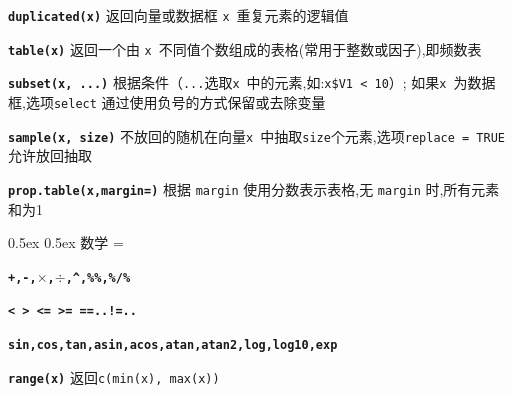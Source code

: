 \documentclass[landscape]{article}
\makeatletter
\renewcommand\section{\@startsection{section}{1}{0mm}%
                                     {0.5ex}%
                                     {0.5ex}%
                                {\color{black}\normalfont\large\bfseries}}
\newcommand{\code}{\texttt}
\newcommand{\bcode}[1]{\texttt{\textbf{#1}}}
\makeatother
\begin{document}
\begin{multicols*}{3}
\bcode{duplicated(x)}  返回向量或数据框 \code{x}~重复元素的逻辑值

\bcode{table(x)}  返回一个由 \code{x}~不同值个数组成的表格(常用于整数或因子),即频数表

\bcode{subset(x, ...)}  根据条件（\code{...}选取\code{x}~中的元素,如:\code{x\$V1 < 10}）;
如果\code{x}~为数据框,选项\code{select} 通过使用负号的方式保留或去除变量

\bcode{sample(x, size)}  不放回的随机在向量\code{x}~中抽取\code{size}个元素,选项\code{replace = TRUE}允许放回抽取

\bcode{prop.table(x,margin=)} 根据 \code{margin} 使用分数表示表格,无 \code{margin} 时,所有元素和为1



\section{数学}
\everypar={\hangindent=9mm}

\bcode{+,-,$\times$,$\div$,\^{},\%\%,\%/\%}

\bcode{< > <= >= ==..!=..}    %

\bcode{sin,cos,tan,asin,acos,atan,atan2,log,log10,exp}



\bcode{range(x)}  返回\code{c(min(x), max(x))}



\end{multicols*}
\end{document}
